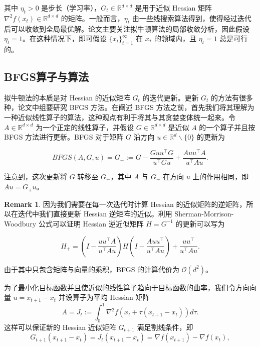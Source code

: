 \documentclass[a4paper,twoside,AutoFakeBold]{article}
\theoremstyle{definition}
\newtheorem{remark2}{{Remark}}
\begin{document}
其中 $\eta_t > 0$ 是步长（学习率），$G_t\in \mathbb{R}^{d\times d}$ 是用于近似 Hessian 矩阵 $\nabla^2 f(x_t)\in \mathbb{R}^{d\times d}$ 的矩阵。一般而言，$\eta_t$ 由一些线搜索算法得到，使得经过迭代后可以收敛到全局最优解。论文主要关注拟牛顿算法的局部收敛分析，因此假设 $\eta_t = 1$。在这种情况下，即可假设 $\{x_t\}_{t = 1}^{\infty}$ 在 $x_*$ 的领域内，且 $\eta_t = 1$ 总是可行的。

\subsection{BFGS算子与算法}\label{section:standard_BFGS}

拟牛顿法的本质是对 Hessian 的近似矩阵 $G_t$ 的迭代更新。更新 $G_t$ 的方法有很多种，论文中组要研究 BFGS 方法。在阐述 BFGS 方法之前，首先我们将其理解为一种近似线性算子的算法，这种观点有利于将其与其贪婪变体统一起来。令 $ A \in \mathbb{R}^{d \times d}$ 为一个正定的线性算子，并假设 $ G \in \mathbb{R}^{d \times d}$ 是近似 $A$ 的一个算子并且按 BFGS 方法进行更新。BFGS 对于矩阵 $G$ 沿方向 $u \in \mathbb{R}^{d}\backslash\{0\}$ 的更新为

\begin{equation}\label{BFGS_update}
    BFGS(A, G, u) = G_+ := G - \frac{G u u^\top G}{u^\top G u} + \frac{A u u^\top A}{u^\top A u}.
\end{equation}

注意到，这次更新将 $G$ 转移至 $G_+$，其中 $A$ 与 $G_+$ 在方向 $u$ 上的作用相同，即 $Au=G_+u$。

\begin{remark2}
    因为我们需要在每一次迭代时计算 Hessian 的近似矩阵的逆矩阵，所以在迭代中我们直接更新 Hessian 逆矩阵的近似。利用 Sherman-Morrison-Woodbury 公式可以证明 Hessian 逆近似矩阵 $H = G^{-1}$ 的更新可以写为

    \begin{equation}\label{BFGS_inverse_update}
        H_+ = \left(I-\frac{u u^\top A}{u^\top Au}\right) H \left(I-\frac{ Au u^\top}{u^\top Au}\right) +\frac{u u^\top}{u^\top Au}.
    \end{equation}
    
    由于其中只包含矩阵与向量的乘积，BFGS 的计算代价为 $\mathcal{O}(d^2)$。    
\end{remark2}

为了最小化目标函数并且使近似的线性算子趋向于目标函数的曲率，我们令方向向量 $u =x_{t+1}-x_t$ 并设算子为平均 Hessian 矩阵 $$A = J_t:= \int_{0}^{1}\nabla^2{f(x_t + \tau(x_{t+1} - x_t))}d\tau.$$这样可以保证新的 Hessian 近似矩阵 $G_{t+1}$ 满足割线条件，即 $$G_{t+1} (x_{t+1}-x_t)=J_t(x_{t+ 1}-x_t) = \nabla f(x_{t+1})-\nabla f(x_t), $$
\end{document}
